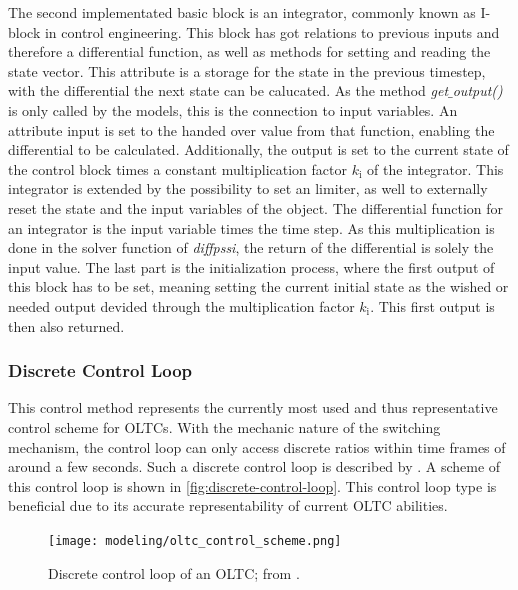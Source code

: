 The second implementated basic block is an integrator, commonly known as I-block in control engineering.
This block has got relations to previous inputs and therefore a differential function, as well as methods for setting and reading the state vector.
This attribute is a storage for the state in the previous timestep, with the differential the next state can be calucated.
As the method \textit{get$\_$output()} is only called by the models, this is the connection to input variables.
An attribute input is set to the handed over value from that function, enabling the differential to be calculated.
Additionally, the output is set to the current state of the control block times a constant multiplication factor $k_\mathrm{i}$ of the integrator.
This integrator is extended by the possibility to set an limiter, as well to externally reset the state and the input variables of the object.
The differential function for an integrator is the input variable times the time step.
As this multiplication is done in the solver function of \textit{diffpssi}, the return of the differential is solely the input value.
The last part is the initialization process, where the first output of this block has to be set, meaning setting the current initial state as the wished or needed output devided through the multiplication factor $k_\mathrm{i}$.
This first output is then also returned.

\subsubsection{Discrete Control Loop}

This control method represents the currently most used and thus representative control scheme for \acsp{OLTC}. 
With the mechanic nature of the switching mechanism, the control loop can only access discrete ratios within time frames of around a few seconds. 
Such a discrete control loop is described by \textcite{milano_2011,milano_2010}. 
A scheme of this control loop is shown in \autoref{fig:discrete-control-loop}.
This control loop type is beneficial due to its accurate representability of current \acs{OLTC} abilities. 

\begin{figure}[htbp!]
        \centering
        \texttt{[image: modeling/oltc\_control\_scheme.png]}
        \caption{Discrete control loop of an \acs{OLTC}; from \textcite{milano_2011}.}
        \label{fig:discrete-control-loop}
\end{figure}

